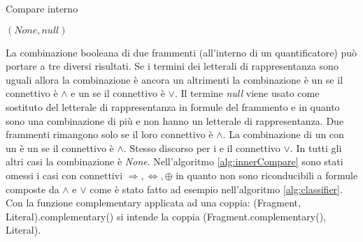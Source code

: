 \documentclass[./main.tex]{subfiles}
\begin{document}
\begin{algorithm}[H] \label{alg:innerCompare}
    \caption{Compare interno}




    \Return $(None, null)$\;
\end{algorithm}


La combinazione booleana di due frammenti \ob (all'interno di un quantificatore) può portare 
a tre diversi risultati.
Se i termini dei letterali di rappresentanza sono uguali allora la combinazione è ancora un \ob altrimenti 
la combinazione è un \cb se il connettivo è $\land$ e un \dbb se il connettivo è $\lor$. 
Il termine \textit{null} viene usato come sostituto del letterale di rappresentanza in formule del frammento \cb e \dbb in quanto 
sono una combinazione di più \ob e non hanno un letterale di rappresentanza.
Due frammenti \cb rimangono \cb solo se il loro connettivo è $\land$.
La combinazione di un \ob con un \cb è un \cb se il connettivo è $\land$. Stesso discorso per i \dbb e il connettivo $\lor$.
In tutti gli altri casi la combinazione è \textit{None}. 
Nell'algoritmo \ref{alg:innerCompare} sono stati omessi i casi con connettivi $\Rightarrow, \Leftrightarrow, \oplus$ 
in quanto non sono riconducibili a formule composte da $\land$ e $\lor$ come è stato fatto ad esempio nell'algoritmo \ref{alg:classifier}.
Con la funzione complementary applicata ad una coppia: (Fragment, Literal).complementary() si intende la coppia (Fragment.complementary(), Literal).
\end{document}
